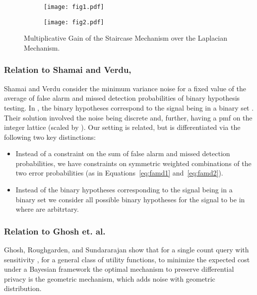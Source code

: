 \begin{figure}[h]
\begin{subfigure}[b]{0.5\linewidth}
\centering
\texttt{[image: fig1.pdf]}
\caption{ }
\label{fig:compare1}
\end{subfigure}
\begin{subfigure}[b]{0.5\linewidth}
\centering
\texttt{[image: fig2.pdf]}
\caption{ }
\label{fig:compare2}
\end{subfigure}
\caption{Multiplicative Gain of the Staircase Mechanism over the Laplacian Mechanism. }
\label{fig:comparison}
\end{figure}


\subsubsection{Relation to Shamai and Verdu, \cite{SV92}}
Shamai and Verdu \cite{SV92} consider the minimum variance noise for a fixed value of the average of false alarm and missed detection probabilities of binary hypothesis testing. In \cite{SV92}, the binary hypotheses correspond to the signal being in a binary set . Their solution involved the noise being discrete and, further, having a pmf on the integer lattice (scaled by ). Our setting is related, but is differentiated via the following two key distinctions:
\begin{itemize}
\item Instead of a constraint on the sum of false alarm and missed detection probabilities, we have constraints on symmetric weighted combinations of the two error probabilities (as in Equations~\eqref{eq:famd1} and~\eqref{eq:famd2}).
\item Instead of the binary hypotheses corresponding to the signal being in a binary set  we consider all possible binary hypotheses for the signal to be in  where  are arbitrtary.
\end{itemize}



\subsubsection{Relation to Ghosh et. al. \cite{Ghosh09} }


Ghosh, Roughgarden, and Sundararajan  \cite{Ghosh09} show that for a single count query with sensitivity , for a general class of utility functions, to minimize the expected cost under a Bayesian framework the optimal mechanism to preserve differential privacy is the geometric mechanism, which adds noise with geometric distribution.

